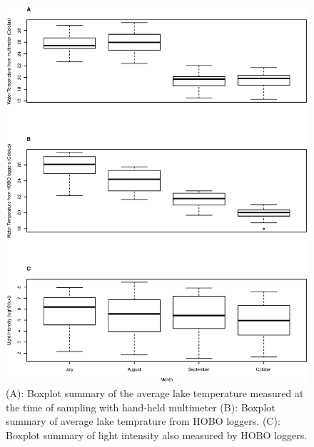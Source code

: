 \begin{figure}
\includegraphics[width=\textwidth]{figures/hobo}
\caption{
(A): Boxplot summary of the average lake temperature measured at the time of sampling with hand-held multimeter 
(B): Boxplot summary of average lake temprature from HOBO loggers. 
(C): Boxplot summary of light intensity also measured by HOBO loggers.
} 
\label{fig:hobo}
\end{figure}


